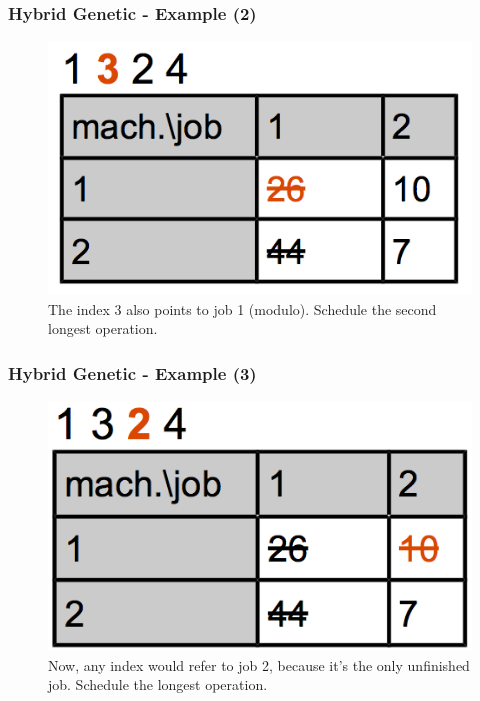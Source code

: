\begin{frame}
  \frametitle{Hybrid Genetic - Example (2)}

\begin{figure}[htbp]
	\centering
		\includegraphics[scale=1]{images/hyb2.png}
	\caption{The index 3 also points to job 1 (modulo). Schedule the second longest operation.}
	\label{fig:label}
\end{figure}
	
 
\end{frame}
\begin{frame}
  \frametitle{Hybrid Genetic - Example (3)}

\begin{figure}[htbp]
	\centering
		\includegraphics[scale=1]{images/hyb3.png}
	\caption{Now, any index would refer to job 2, because it's the only unfinished job. Schedule the longest operation.}
	\label{fig:label}
\end{figure}
	
 
\end{frame}
